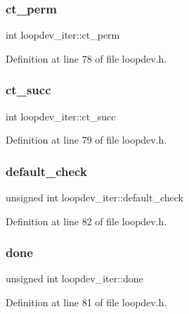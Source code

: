 \subsubsection{\texorpdfstring{ct\+\_\+perm}{ct\_perm}}
{\footnotesize\ttfamily int loopdev\+\_\+iter\+::ct\+\_\+perm}



Definition at line 78 of file loopdev.\+h.

\mbox{\label{structloopdev__iter_a53278ff8ff4caf72a03782110ca57c99}} 
\subsubsection{\texorpdfstring{ct\+\_\+succ}{ct\_succ}}
{\footnotesize\ttfamily int loopdev\+\_\+iter\+::ct\+\_\+succ}



Definition at line 79 of file loopdev.\+h.

\mbox{\label{structloopdev__iter_a2c9c706807febcc561da3ba918cb3c49}} 
\subsubsection{\texorpdfstring{default\+\_\+check}{default\_check}}
{\footnotesize\ttfamily unsigned int loopdev\+\_\+iter\+::default\+\_\+check}



Definition at line 82 of file loopdev.\+h.

\mbox{\label{structloopdev__iter_aa25ce39afbcf425be7d101066da48eff}} 
\subsubsection{\texorpdfstring{done}{done}}
{\footnotesize\ttfamily unsigned int loopdev\+\_\+iter\+::done}



Definition at line 81 of file loopdev.\+h.

